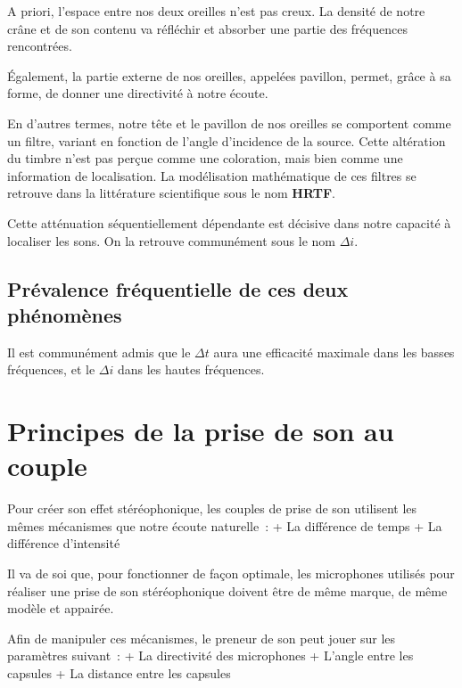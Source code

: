 \documentclass[
]{book}
\begin{document}
A priori, l'espace entre nos deux oreilles n'est pas creux. La densité de notre crâne et de son contenu va réfléchir et absorber une partie des fréquences rencontrées.

Également, la partie externe de nos oreilles, appelées pavillon, permet, grâce à sa forme, de donner une directivité à notre écoute.

En d'autres termes, notre tête et le pavillon de nos oreilles se comportent comme un filtre, variant en fonction de l'angle d'incidence de la source. Cette altération du timbre n'est pas perçue comme une coloration, mais bien comme une information de localisation. La modélisation mathématique de ces filtres se retrouve dans la littérature scientifique sous le nom \textbf{HRTF}.

Cette atténuation séquentiellement dépendante est décisive dans notre capacité à localiser les sons. On la retrouve communément sous le nom \(\Delta i\).

\hypertarget{pruxe9valence-fruxe9quentielle-de-ces-deux-phuxe9nomuxe8nes}{%
\subsection{Prévalence fréquentielle de ces deux phénomènes}\label{pruxe9valence-fruxe9quentielle-de-ces-deux-phuxe9nomuxe8nes}}

Il est communément admis que le \(\Delta t\) aura une efficacité maximale dans les basses fréquences, et le \(\Delta i\) dans les hautes fréquences.

\hypertarget{principes-de-la-prise-de-son-au-couple}{%
\section{Principes de la prise de son au couple}\label{principes-de-la-prise-de-son-au-couple}}

Pour créer son effet stéréophonique, les couples de prise de son utilisent les mêmes mécanismes que notre écoute naturelle~:
+ La différence de temps
+ La différence d'intensité

Il va de soi que, pour fonctionner de façon optimale, les microphones utilisés pour réaliser une prise de son stéréophonique doivent être de même marque, de même modèle et appairée.

Afin de manipuler ces mécanismes, le preneur de son peut jouer sur les paramètres suivant~:
+ La directivité des microphones
+ L'angle entre les capsules
+ La distance entre les capsules
\end{document}
